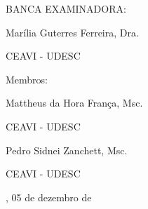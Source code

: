 

%
% 
%
\begin{folhadeaprovacao}



	\begin{center}
		{\selectfont\MakeTextUppercase{\normalsize\imprimirautor}}
	\end{center}
    \vfill
    
	\vfill
	\begin{center}
		{\selectfont\MakeTextUppercase{\imprimirtitulo}}
	\end{center}
	\vfill

    
%


\vfill
        
	 \begin{center}
	 	
    	{\selectfont BANCA EXAMINADORA: }
    	\vspace*{1.75cm}
    
		Marília Guterres Ferreira, Dra. \par
		CEAVI - UDESC
	 \end{center}
	
	{Membros:} 
    
	\begin{center}
		\vspace*{1.25cm}
		Mattheus da Hora França, Msc. \par
		CEAVI - UDESC
		
		\vspace*{1.25cm}
		Pedro Sidnei Zanchett, Msc. \par
		CEAVI - UDESC
	
	\end{center}
    
    \vspace*{\fill}  
    \begin{center}
    {\imprimirlocal, 05 de dezembro de \imprimirdata}
	\end{center}
    \vspace*{0.25cm}  
\end{folhadeaprovacao}




